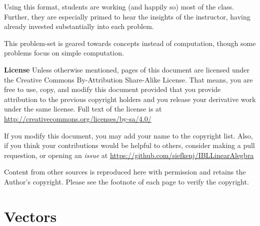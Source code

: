 \documentclass[14pt]{problemset}
\begin{document}
	Using this format, students are working (and happily so) most of the class.
	Further, they are especially primed to hear the insights of the instructor, 
	having already invested substantially into each problem.

	This problem-set is geared towards concepts instead of computation, though some problems
	focus on simple computation.

	{\bf License}  Unless otherwise mentioned, pages of this document are licensed under the Creative Commons
	By-Attribution Share-Alike License.  That means, you are free to use,
	copy, and modify this document provided that you provide attribution
	to the previous copyright holders and you release your derivative work 
	under the same license.  Full text of the license is at \url{http://creativecommons.org/licenses/by-sa/4.0/}

	If you modify this document, you may add your name to the copyright list.  Also,
	if you think your contributions would be helpful to others, consider making a pull
	requestion, or opening an \emph{issue} at 
	\url{https://github.com/siefkenj/IBLLinearAlegbra}

	Content from other sources is reproduced here with permission and retains the Author's copyright.
	Please see the footnote of each page to verify the copyright.


\newpage

\setcounter{page}{1}
\pagestyle{siefken}
\section*{Vectors}
\end{document}

